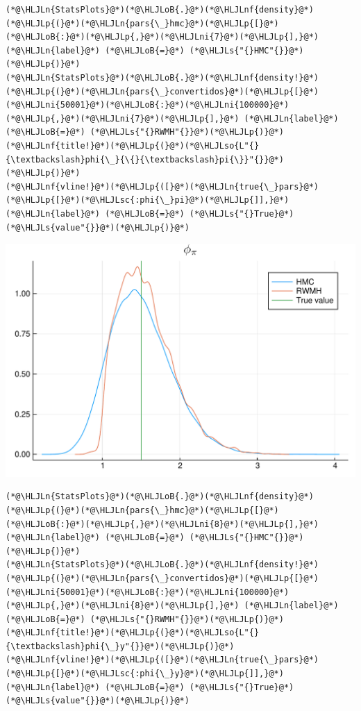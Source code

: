 \documentclass[12pt,a4paper]{article}
\newcommand{\HLJLn}[1]{#1}
\newcommand{\HLJLnf}[1]{\textcolor[RGB]{66,102,213}{#1}}
\newcommand{\HLJLs}[1]{\textcolor[RGB]{201,61,57}{#1}}
\newcommand{\HLJLsc}[1]{\textcolor[RGB]{201,61,57}{#1}}
\newcommand{\HLJLso}[1]{\textcolor[RGB]{201,61,57}{#1}}
\newcommand{\HLJLni}[1]{\textcolor[RGB]{59,151,46}{#1}}
\newcommand{\HLJLoB}[1]{\textcolor[RGB]{102,102,102}{\textbf{#1}}}
\newcommand{\HLJLp}[1]{#1}
\begin{document}
\begin{lstlisting}
(*@\HLJLn{StatsPlots}@*)(*@\HLJLoB{.}@*)(*@\HLJLnf{density}@*)(*@\HLJLp{(}@*)(*@\HLJLn{pars{\_}hmc}@*)(*@\HLJLp{[}@*)(*@\HLJLoB{:}@*)(*@\HLJLp{,}@*)(*@\HLJLni{7}@*)(*@\HLJLp{],}@*) (*@\HLJLn{label}@*) (*@\HLJLoB{=}@*) (*@\HLJLs{"{}HMC"{}}@*)(*@\HLJLp{)}@*)
(*@\HLJLn{StatsPlots}@*)(*@\HLJLoB{.}@*)(*@\HLJLnf{density!}@*)(*@\HLJLp{(}@*)(*@\HLJLn{pars{\_}convertidos}@*)(*@\HLJLp{[}@*)(*@\HLJLni{50001}@*)(*@\HLJLoB{:}@*)(*@\HLJLni{100000}@*)(*@\HLJLp{,}@*)(*@\HLJLni{7}@*)(*@\HLJLp{],}@*) (*@\HLJLn{label}@*) (*@\HLJLoB{=}@*) (*@\HLJLs{"{}RWMH"{}}@*)(*@\HLJLp{)}@*)
(*@\HLJLnf{title!}@*)(*@\HLJLp{(}@*)(*@\HLJLso{L"{}{\textbackslash}phi{\_}{\{}{\textbackslash}pi{\}}"{}}@*)(*@\HLJLp{)}@*)
(*@\HLJLnf{vline!}@*)(*@\HLJLp{([}@*)(*@\HLJLn{true{\_}pars}@*)(*@\HLJLp{[}@*)(*@\HLJLsc{:phi{\_}pi}@*)(*@\HLJLp{]],}@*) (*@\HLJLn{label}@*) (*@\HLJLoB{=}@*) (*@\HLJLs{"{}True}@*) (*@\HLJLs{value"{}}@*)(*@\HLJLp{)}@*)
\end{lstlisting}

\includegraphics[width=\linewidth]{figures/dsge_and_julia_50_1.pdf}

\begin{lstlisting}
(*@\HLJLn{StatsPlots}@*)(*@\HLJLoB{.}@*)(*@\HLJLnf{density}@*)(*@\HLJLp{(}@*)(*@\HLJLn{pars{\_}hmc}@*)(*@\HLJLp{[}@*)(*@\HLJLoB{:}@*)(*@\HLJLp{,}@*)(*@\HLJLni{8}@*)(*@\HLJLp{],}@*) (*@\HLJLn{label}@*) (*@\HLJLoB{=}@*) (*@\HLJLs{"{}HMC"{}}@*)(*@\HLJLp{)}@*)
(*@\HLJLn{StatsPlots}@*)(*@\HLJLoB{.}@*)(*@\HLJLnf{density!}@*)(*@\HLJLp{(}@*)(*@\HLJLn{pars{\_}convertidos}@*)(*@\HLJLp{[}@*)(*@\HLJLni{50001}@*)(*@\HLJLoB{:}@*)(*@\HLJLni{100000}@*)(*@\HLJLp{,}@*)(*@\HLJLni{8}@*)(*@\HLJLp{],}@*) (*@\HLJLn{label}@*) (*@\HLJLoB{=}@*) (*@\HLJLs{"{}RWMH"{}}@*)(*@\HLJLp{)}@*)
(*@\HLJLnf{title!}@*)(*@\HLJLp{(}@*)(*@\HLJLso{L"{}{\textbackslash}phi{\_}y"{}}@*)(*@\HLJLp{)}@*)
(*@\HLJLnf{vline!}@*)(*@\HLJLp{([}@*)(*@\HLJLn{true{\_}pars}@*)(*@\HLJLp{[}@*)(*@\HLJLsc{:phi{\_}y}@*)(*@\HLJLp{]],}@*) (*@\HLJLn{label}@*) (*@\HLJLoB{=}@*) (*@\HLJLs{"{}True}@*) (*@\HLJLs{value"{}}@*)(*@\HLJLp{)}@*)
\end{lstlisting}
\end{document}
